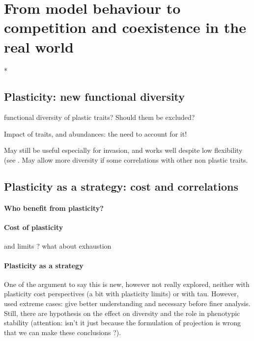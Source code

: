 \section{From model behaviour to competition and coexistence in the real world}*


\subsection{Plasticity: new functional diversity}

functional diversity of plastic traits? Should them be excluded?

Impact of traits, and abundances: the need to account for it!

May still be useful especially for invasion, and works well despite low flexibility (see \parencite{forsman_rethinking_2014}. May allow more diversity if some correlations with other non plastic traits.	

\subsection{Plasticity as a strategy: cost and correlations}

\paragraph{Who benefit from plasticity?}

\paragraph{Cost of plasticity}

and limits ? what about exhaustion

\paragraph{Plasticity as a strategy}
One of the argument to say this is new, however not really explored, neither with plasticity cost perspectives (a bit with plasticity limits) or with tau. However, used extreme cases: give better understanding and necessary before finer analysis. Still, there are hypothesis on the effect on diversity and the role in phenotypic stability (attention: isn't it just because the formulation of projection is wrong that we can make these conclusions ?).



